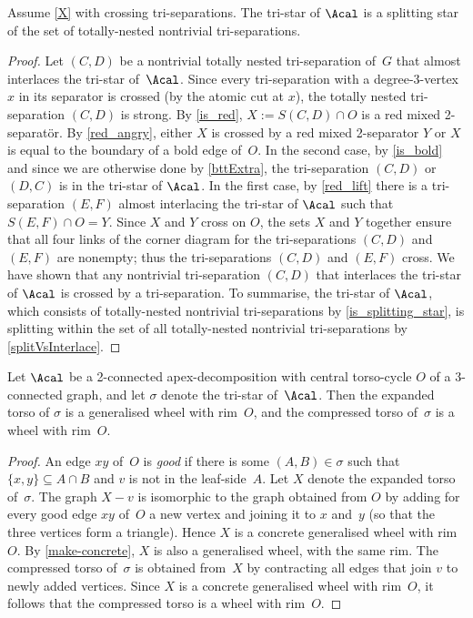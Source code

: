 \documentclass{aic}
\newcommand{\se}{\subseteq}
\theoremstyle{plain}
\theoremstyle{definition}
\theoremstyle{plain}
\theoremstyle{plain}
\begin{document}
\begin{lem}\label{is_splitting}
Assume \autoref{X} with crossing tri-separations.
The tri-star of $\Acal$ is a splitting star of the set of totally-nested nontrivial tri-separations.
\end{lem}

\begin{proof}
Let $(C,D)$ be a nontrivial totally nested tri-separation of~$G$ that almost interlaces the tri-star of~$\Acal$. Since every tri-separation with a degree-3-vertex $x$ in its separator is crossed (by the atomic cut at $x$), the totally nested tri-separation $(C,D)$ is strong.
     By \autoref{is_red}, $X:=S(C,D)\cap O$ is a red mixed 2-separat{\"o}r.
    By \autoref{red_angry}, either $X$ is crossed by a red mixed 2-separator $Y$ or $X$ is equal to the boundary of a bold edge of~$O$.
    In the second case, by \autoref{is_bold} and since we are otherwise done by \autoref{bttExtra}, the tri-separation $(C,D)$ or $(D,C)$ is in the tri-star of $\Acal$.
    In the first case, by \autoref{red_lift} there is a tri-separation $(E,F)$ almost interlacing the tri-star of $\Acal$ such that $S(E,F)\cap O=Y$.
    Since $X$ and $Y$ cross on $O$, the sets $X$ and $Y$ together ensure that all four links of the corner diagram for the tri-separations $(C,D)$ and $(E,F)$ are nonempty; thus the tri-separations $(C,D)$ and $(E,F)$ cross. We have shown that any nontrivial tri-separation $(C,D)$ that interlaces the tri-star of $\Acal$ is crossed by a tri-separation.
    To summarise, the tri-star of $\Acal$, which consists of  totally-nested nontrivial tri-separations by \autoref{is_splitting_star}, is splitting within the set of all totally-nested nontrivial tri-separations by \autoref{splitVsInterlace}.
\end{proof} 

\begin{lem}\label{is_gen-wheel}
Let $\Acal$ be a 2-connected apex-decomposition with central torso-cycle $O$ of a 3-connected graph, and let $\sigma$ denote the tri-star of~$\Acal$.
Then the expanded torso of $\sigma$ is a generalised wheel with rim~$O$, and the compressed torso of~$\sigma$ is a wheel with rim~$O$.
\end{lem}
\begin{proof}
An edge $xy$ of~$O$ is \emph{good} if there is some $(A,B)\in \sigma$ such that $\{x,y\}\se A\cap B$ and $v$ is not in the leaf-side~$A$.
Let $X$ denote the expanded torso of~$\sigma$.
The graph $X-v$ is isomorphic to the graph obtained from $O$ by adding for every good edge $xy$ of~$O$ a new vertex and joining it to $x$ and~$y$ (so that the three vertices form a triangle).
Hence $X$ is a concrete generalised wheel with rim~$O$.
By \autoref{make-concrete}, $X$ is also a generalised wheel, with the same rim.
The compressed torso of~$\sigma$ is obtained from~$X$ by contracting all edges that join $v$ to newly added vertices.
Since $X$ is a concrete generalised wheel with rim~$O$, it follows that the compressed torso is a wheel with rim~$O$.
\end{proof}
\end{document}
